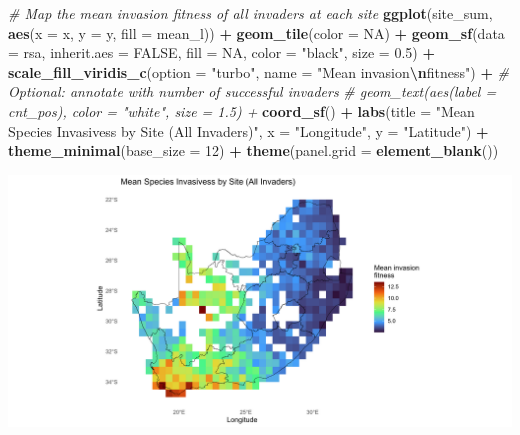 \documentclass[
]{article}
\newenvironment{Shaded}{\begin{snugshade}}{\end{snugshade}}
\newcommand{\AttributeTok}[1]{\textcolor[rgb]{0.13,0.29,0.53}{#1}}
\newcommand{\CommentTok}[1]{\textcolor[rgb]{0.56,0.35,0.01}{\textit{#1}}}
\newcommand{\ConstantTok}[1]{\textcolor[rgb]{0.56,0.35,0.01}{#1}}
\newcommand{\DecValTok}[1]{\textcolor[rgb]{0.00,0.00,0.81}{#1}}
\newcommand{\FloatTok}[1]{\textcolor[rgb]{0.00,0.00,0.81}{#1}}
\newcommand{\FunctionTok}[1]{\textcolor[rgb]{0.13,0.29,0.53}{\textbf{#1}}}
\newcommand{\NormalTok}[1]{#1}
\newcommand{\SpecialCharTok}[1]{\textcolor[rgb]{0.81,0.36,0.00}{\textbf{#1}}}
\newcommand{\StringTok}[1]{\textcolor[rgb]{0.31,0.60,0.02}{#1}}
\begin{document}
\begin{Shaded}
\begin{Highlighting}[]
\CommentTok{\# Map the mean invasion fitness of all invaders at each site}
\FunctionTok{ggplot}\NormalTok{(site\_sum, }\FunctionTok{aes}\NormalTok{(}\AttributeTok{x =}\NormalTok{ x, }\AttributeTok{y =}\NormalTok{ y, }\AttributeTok{fill =}\NormalTok{ mean\_l)) }\SpecialCharTok{+}
  \FunctionTok{geom\_tile}\NormalTok{(}\AttributeTok{color =} \ConstantTok{NA}\NormalTok{) }\SpecialCharTok{+}
  \FunctionTok{geom\_sf}\NormalTok{(}\AttributeTok{data =}\NormalTok{ rsa, }\AttributeTok{inherit.aes =} \ConstantTok{FALSE}\NormalTok{, }\AttributeTok{fill =} \ConstantTok{NA}\NormalTok{, }\AttributeTok{color =} \StringTok{"black"}\NormalTok{, }\AttributeTok{size =} \FloatTok{0.5}\NormalTok{) }\SpecialCharTok{+}
  \FunctionTok{scale\_fill\_viridis\_c}\NormalTok{(}\AttributeTok{option =} \StringTok{"turbo"}\NormalTok{, }\AttributeTok{name =} \StringTok{"Mean invasion}\SpecialCharTok{\textbackslash{}n}\StringTok{fitness"}\NormalTok{) }\SpecialCharTok{+}
  \CommentTok{\# Optional: annotate with number of successful invaders}
  \CommentTok{\# geom\_text(aes(label = cnt\_pos), color = "white", size = 1.5) +}
  \FunctionTok{coord\_sf}\NormalTok{() }\SpecialCharTok{+}
  \FunctionTok{labs}\NormalTok{(}\AttributeTok{title =} \StringTok{"Mean Species Invasivess by Site (All Invaders)"}\NormalTok{, }
       \AttributeTok{x =} \StringTok{"Longitude"}\NormalTok{,}
       \AttributeTok{y =} \StringTok{"Latitude"}\NormalTok{) }\SpecialCharTok{+}
  \FunctionTok{theme\_minimal}\NormalTok{(}\AttributeTok{base\_size =} \DecValTok{12}\NormalTok{) }\SpecialCharTok{+}
  \FunctionTok{theme}\NormalTok{(}\AttributeTok{panel.grid =} \FunctionTok{element\_blank}\NormalTok{())}
\end{Highlighting}
\end{Shaded}

\includegraphics[width=1\linewidth]{man/figures/README-spp-invasiness-1}
\end{document}
